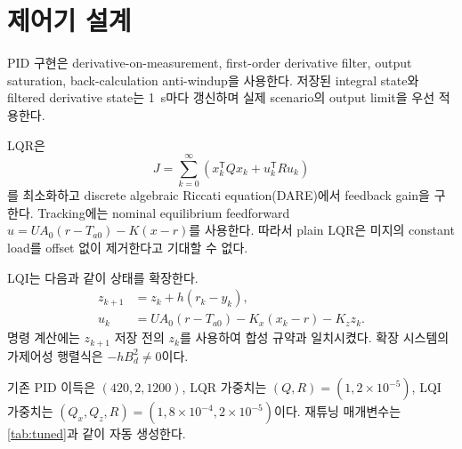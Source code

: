 \section{제어기 설계}\label{sec:controllers}
PID 구현은 derivative-on-measurement, first-order derivative filter, output saturation, back-calculation anti-windup을 사용한다. 저장된 integral state와 filtered derivative state는 \SI{1}{s}마다 갱신하며 실제 scenario의 output limit을 우선 적용한다.

LQR은
\begin{equation}
J=\sum_{k=0}^{\infty}(x_k^{\mathsf T}Qx_k+u_k^{\mathsf T}Ru_k) \label{eq:lqcost}
\end{equation}
를 최소화하고 discrete algebraic Riccati equation(DARE)에서 feedback gain을 구한다. Tracking에는 nominal equilibrium feedforward $u=UA_0(r-T_{a0})-K(x-r)$를 사용한다. 따라서 plain LQR은 미지의 constant load를 offset 없이 제거한다고 기대할 수 없다.

LQI는 다음과 같이 상태를 확장한다.
\begin{align}
z_{k+1}&=z_k+h(r_k-y_k),\nonumber\\
u_k&=UA_0(r-T_{a0})-K_x(x_k-r)-K_z z_k. \label{eq:lqi}
\end{align}
명령 계산에는 $z_{k+1}$ 저장 전의 $z_k$를 사용하여 합성 규약과 일치시켰다. 확장 시스템의 가제어성 행렬식은 $-hB_d^2\ne0$이다.

기존 PID 이득은 $(420,2,1200)$, LQR 가중치는 $(Q,R)=(1,2\times10^{-5})$, LQI 가중치는 $(Q_x,Q_z,R)=(1,8\times10^{-4},2\times10^{-5})$이다. 재튜닝 매개변수는 \cref{tab:tuned}과 같이 자동 생성한다.
\begin{table}[!htbp]\centering\caption{Equal-budget parameters: PID $(K_p,K_i,K_d)$, LQR $(Q,R)$, LQI $(Q_x,Q_z,R)$.}\label{tab:tuned}\resizebox{\linewidth}{!}{}\end{table}
